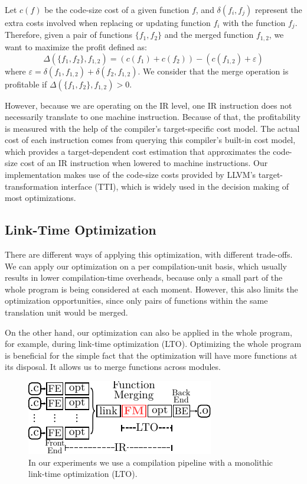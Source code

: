 Let $c(f)$ be the code-size cost of a given function $f$, and
$\delta(f_i, f_j)$ represent the extra costs involved when replacing or
updating function $f_i$ with the function $f_j$.
Therefore, given a pair of functions $\{f_1,f_2\}$ and the merged function
$f_{1,2}$, we want to maximize the profit defined as:
\[
  \Delta(\{f_1,f_2\},f_{1,2}) = (c(f_1)+c(f_2)) - (c(f_{1,2}) + \varepsilon)
\]
where $\varepsilon = \delta(f_1, f_{1,2}) + \delta(f_2, f_{1,2})$.
We consider that the merge operation is profitable if $\Delta(\{f_1,f_2\},f_{1,2})>0$.

However, because we are operating on the IR level, one IR instruction does not
necessarily translate to one machine instruction.
Because of that, the profitability is measured with the help of the compiler's
target-specific cost model.
The actual cost of each instruction comes from querying this compiler's built-in
cost model, which provides a target-dependent cost estimation that approximates
the code-size cost of an IR instruction when lowered to machine instructions.
Our implementation makes use of the code-size costs provided by LLVM's
target-transformation interface (TTI), which is widely used in the decision
making of most optimizations.

\subsection{Link-Time Optimization}

There are different ways of applying this optimization, with different trade-offs.
We can apply our optimization on a per compilation-unit basis, which usually
results in lower compilation-time overheads, because only a small part of the
whole program is being considered at each moment.
However, this also limits the optimization opportunities, since only pairs of
functions within the same translation unit would be merged.

On the other hand, our optimization can also be applied in the whole program,
for example, during link-time optimization (LTO).
Optimizing the whole program is beneficial for the simple fact that the
optimization will have more functions at its disposal.
It allows us to merge functions across modules.

\begin{figure}[h]
  \centering
  \includegraphics[width=0.7\linewidth]{figs/opt-pipeline.pdf}
  \caption{In our experiments we use a compilation pipeline with a monolithic link-time optimization (LTO).}
  \label{fig:opt-pipeline}
\end{figure}


